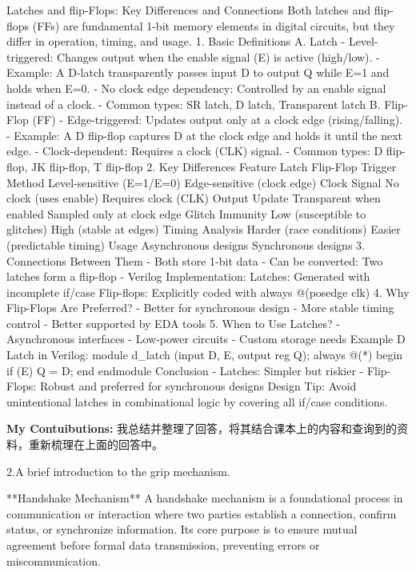 \documentclass[11pt, a4 paper]{article}
\begin{document}
Latches and flip-Flops: Key Differences and Connections  
Both latches and flip-flops (FFs) are fundamental 1-bit memory elements in digital circuits, but they differ in operation, timing, and usage.  
1. Basic Definitions  
A. Latch  
- Level-triggered: Changes output when the enable signal (E) is active (high/low).  
- Example: A D-latch transparently passes input D to output Q while E=1 and holds when E=0.  
- No clock edge dependency: Controlled by an enable signal instead of a clock.  
- Common types: SR latch, D latch, Transparent latch  
B. Flip-Flop (FF)  
- Edge-triggered: Updates output only at a clock edge (rising/falling).  
- Example: A D flip-flop captures D at the clock edge and holds it until the next edge.  
- Clock-dependent: Requires a clock (CLK) signal.  
- Common types: D flip-flop, JK flip-flop, T flip-flop  
2. Key Differences  
Feature          Latch                          Flip-Flop  
Trigger Method   Level-sensitive (E=1/E=0)      Edge-sensitive (clock edge)  
Clock Signal     No clock (uses enable)         Requires clock (CLK)  
Output Update    Transparent when enabled       Sampled only at clock edge  
Glitch Immunity  Low (susceptible to glitches)  High (stable at edges)  
Timing Analysis  Harder (race conditions)       Easier (predictable timing)  
Usage            Asynchronous designs           Synchronous designs  
3. Connections Between Them  
- Both store 1-bit data  
- Can be converted: Two latches form a flip-flop  
- Verilog Implementation:  
  Latches: Generated with incomplete if/case  
  Flip-flops: Explicitly coded with always @(posedge clk)  
4. Why Flip-Flops Are Preferred?  
- Better for synchronous design  
- More stable timing control  
- Better supported by EDA tools  
5. When to Use Latches?  
- Asynchronous interfaces  
- Low-power circuits  
- Custom storage needs  
Example D Latch in Verilog:  
module d\_latch (input D, E, output reg Q);  
always @(*) begin if (E) Q = D; end  
endmodule  
Conclusion  
- Latches: Simpler but riskier  
- Flip-Flops: Robust and preferred for synchronous designs  
Design Tip: Avoid unintentional latches in combinational logic by covering all if/case conditions.

\textbf{My Contuibutions:} 我总结并整理了回答，将其结合课本上的内容和查询到的资料，重新梳理在上面的回答中。

2.A brief introduction to the grip mechanism.

**Handshake Mechanism**  
A handshake mechanism is a foundational process in communication or interaction where two parties establish a connection, confirm status, or synchronize information. Its core purpose is to ensure mutual agreement before formal data transmission, preventing errors or miscommunication.  
\end{document}
